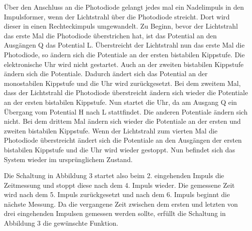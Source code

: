              Über den Anschluss an die Photodiode gelangt jedes mal ein Nadelimpuls in den Impulsformer, wenn der Lichtstrahl über die Photodiode streicht. Dort wird dieser in einen Rechteckimpuls umgewandelt. Zu Beginn, bevor der Lichtstrahl das erste Mal die Photodiode überstrichen hat, ist das Potential an den Ausgängen Q das Potential L. Überstreicht der Lichtstrahl nun das erste Mal die Photodiode, so ändern sich die Potentiale an der ersten bistabilen Kippstufe. Die elektronische Uhr wird nicht gestartet. Auch an der zweiten bistabilen Kippstufe ändern sich die Potentiale. Dadurch ändert sich das Potential an der monostabilen Kippstufe und die Uhr wird zurückgesetzt. Bei dem zweitem Mal, dass der Lichtstrahl die Photodiode überstreicht ändern sich wieder die Potentiale an der ersten bistabilen Kippstufe. Nun startet die Uhr, da am Ausgang Q ein Übergang vom Potential H nach L stattfindet. Die anderen Potentiale ändern sich nicht. Bei dem drittem Mal ändern sich wieder die Potentiale an der ersten und zweiten bistabilen Kippstufe. Wenn der Lichtstrahl zum vierten Mal die Photodiode überstreicht ändert sich die Potentiale an den Ausgängen der ersten bistabilen Kippstufe und die Uhr wird wieder gestoppt. Nun befindet sich das System wieder im ursprünglichem Zustand.
             
             Die Schaltung in Abbildung 3 startet also beim 2. eingehenden Impuls die Zeitmessung und stoppt diese nach dem 4. Impuls wieder. Die gemessene Zeit wird nach dem 5. Impuls zurückgesetzt und nach dem 6. Impuls beginnt die nächste Messung. Da die vergangene Zeit zwischen dem ersten und letzten von drei eingehenden Impulsen gemessen werden sollte, erfüllt die Schaltung in Abbildung 3 die gewünschte Funktion.
